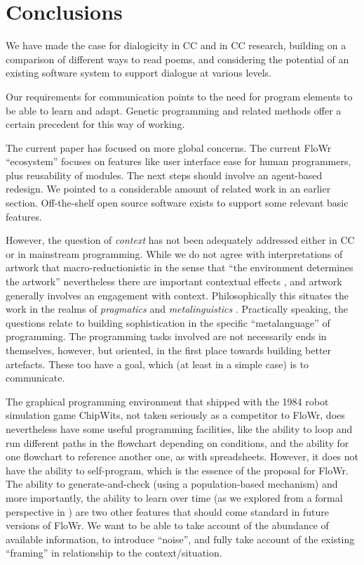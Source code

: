 \section{Conclusions}
\label{sec:conc}

We have made the case for dialogicity in CC and in CC research,
building on a comparison of different ways to read poems, and
considering the potential of an existing software system to support
dialogue at various levels.

Our requirements for communication points to the need for program
elements to be able to learn and adapt.  Genetic programming
\cite{koza1992genetic} and related methods offer a certain precedent
for this way of working.

The current paper has focused on more global concerns.  The current
FloWr ``ecosystem'' focuses on features like user interface ease for
human programmers, plus reusability of modules.  The next steps should
involve an agent-based redesign.  We pointed to a considerable amount
of related work in an earlier section.  Off-the-shelf open source
software exists to support some relevant basic features.

However, the question of \emph{context} has not been adequately
addressed either in CC or in mainstream programming.  While we do not
agree with interpretations of artwork that macro-reductionistic in the
sense that ``the environment determines the artwork'' nevertheless
there are important contextual effects \cite{geertz1976art}, and
artwork generally involves an engagement with context.
Philosophically this situates the work in the realms of
\emph{pragmatics} \cite{sep-pragmatics} and \emph{metalinguistics}
\cite{gombert1994development}.  Practically speaking, the questions
relate to building sophistication in the specific ``metalanguage'' of
programming.  The programming tasks involved are not necessarily ends
in themselves, however, but oriented, in the first place towards
building better artefacts.  These too have a goal, which (at least in
a simple case) is to communicate.

The graphical programming environment that shipped with the 1984 robot
simulation game ChipWits, not taken seriously as a competitor to
FloWr, does nevertheless have some useful programming facilities, like
the ability to loop and run different paths in the flowchart depending
on conditions, and the ability for one flowchart to reference another
one, as with spreadsheets.  However, it does not have the ability to
self-program, which is the essence of the proposal for FloWr.  The
ability to generate-and-check (using a population-based mechanism) and
more importantly, the ability to learn over time (as we explored from
a formal perspective in \cite{colton-assessingprogress}) are two other
features that should come standard in future versions of FloWr.  We
want to be able to take account of the abundance of available
information, to introduce ``noise'', and fully take account of the
existing ``framing'' in relationship to the context/situation.


